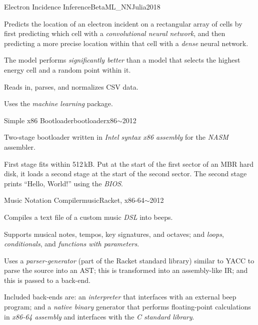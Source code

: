 \begin{project}{Electron Incidence Inference}{BetaML\_NN}{Julia}{2018}
    \item Predicts the location of an electron
        incident on a rectangular array of cells
        by first predicting which cell with a
        \emph{convolutional neural network},
        and then predicting a more precise location within that cell
        with a \emph{dense} neural network.
    \item The model performs \emph{significantly better}
        than a model that selects the highest energy cell
        and a random point within it.
    \item Reads in, parses, and normalizes CSV data.
    \item Uses the  \emph{machine learning} package.
\end{project}

\begin{project}{Simple x86 Bootloader}{bootloader}{x86}{${\sim}$2012}
    \item Two-stage bootloader written in \emph{Intel syntax x86 assembly}
        for the \emph{NASM} assembler.
    \item First stage fits within 512\,kB.
    Put at the start of the first sector of an MBR hard disk,
        it loads a second stage at the start of the second sector.
    The second stage prints ``Hello, World!'' using the \emph{BIOS}.
\end{project}

\begin{project}{Music Notation Compiler}{music}{Racket, x86-64}{${\sim}$2012}
    \item Compiles a text file of a custom music \emph{DSL} into beeps.
    \item Supports musical notes, tempos, key signatures, and octaves;
        and \emph{loops}, \emph{conditionals},
        and \emph{functions with parameters}.
    \item Uses a \emph{parser-generator}
        (part of the Racket standard library)
        similar to YACC to parse the source into an AST;
        this is transformed into an assembly-like IR;
        and this is passed to a back-end.
    \item Included back-ends are:
        an \emph{interpreter} that interfaces with an external beep program;
        and a \emph{native binary} generator
        that performs floating-point calculations
        in \emph{x86-64 assembly}
        and interfaces with the \emph{C standard library}.
\end{project}
